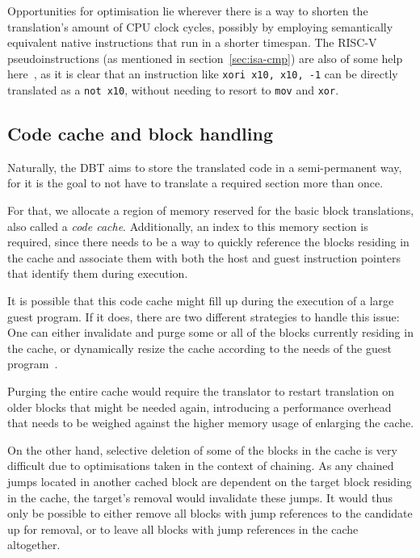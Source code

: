 Opportunities for optimisation lie wherever there is a way to shorten the translation's amount of CPU clock cycles, possibly by employing semantically equivalent native instructions that run in a shorter timespan.
The RISC-V pseudoinstructions (as mentioned in section~\ref{sec:isa-cmp}) are also of some help here~\cite[S. 139]{riscvspec}, as it is clear that an instruction like \texttt{xori x10, x10, -1} can be directly translated as a \texttt{not x10}, without needing to resort to \texttt{mov} and \texttt{xor}.


\subsection{Code cache and block handling}
Naturally, the DBT aims to store the translated code in a semi-permanent way, for it is the goal to not have to translate a required section more than once.

For that, we allocate a region of memory reserved for the basic block translations, also called a \textit{code cache}.
Additionally, an index to this memory section is required, since there needs to be a way to quickly reference the blocks residing in the cache and associate them with both the host and guest instruction pointers that identify them during execution.


It is possible that this code cache might fill up during the execution of a large guest program.
If it does, there are two different strategies to handle this issue:
One can either invalidate and purge some or all of the blocks currently residing in the cache, or dynamically resize the cache according to the needs of the guest program~\cite[S. 3]{bintrans}.

Purging the entire cache would require the translator to restart translation on older blocks that might be needed again, introducing a performance overhead that needs to be weighed against the higher memory usage of enlarging the cache.

On the other hand, selective deletion of some of the blocks in the cache is very difficult due to optimisations taken in the context of chaining.
As any chained jumps located in another cached block are dependent on the target block residing in the cache, the target's removal would invalidate these jumps.
It would thus only be possible to either remove all blocks with jump references to the candidate up for removal, or to leave all blocks with jump references in the cache altogether.


